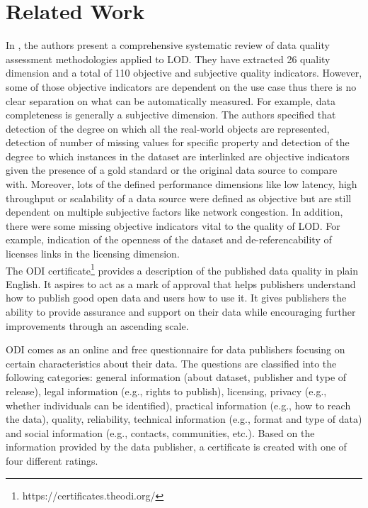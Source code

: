 \documentclass[onecolumn, crcready]{iosart2c}
\begin{document}
\section{Related Work}

In \cite{Framework2012}, the authors present a comprehensive systematic review of data quality assessment methodologies applied to LOD. They have extracted 26 quality dimension and a total of 110 objective and subjective quality indicators. However, some of those objective indicators are dependent on the use case thus there is no clear separation on what can be automatically measured. For example, data completeness is generally a subjective dimension. The authors specified that detection of the degree on which all the real-world objects are represented, detection of number of missing values for specific property and detection of the degree to which instances in the dataset are interlinked are objective indicators given the presence of a gold standard or the original data source to compare with. Moreover, lots of the defined performance dimensions like low latency, high throughput or scalability of a data source were defined as objective but are still dependent on multiple subjective factors like network congestion. In addition, there were some missing objective indicators vital to the quality of LOD. For example, indication of the openness of the dataset and de-referencability of licenses links in the licensing dimension.\\

The ODI certificate\footnote {https://certificates.theodi.org/} provides a description of the published data quality in plain English. It aspires to act as a mark of approval that helps publishers understand how to publish good open data and users how to use it. It gives publishers the ability to provide assurance and support on their data while encouraging further improvements through an ascending scale.

ODI comes as an online and free questionnaire for data publishers focusing on certain characteristics about their data. The questions are classified into the following categories: general information (about dataset, publisher and type of release), legal information (e.g., rights to publish), licensing, privacy (e.g., whether individuals can be identified), practical information (e.g., how to reach the data), quality, reliability, technical information (e.g., format and type of data) and social information (e.g., contacts, communities, etc.). Based on the information provided  by the data  publisher,  a certificate  is created  with one of four different ratings.
\end{document}
